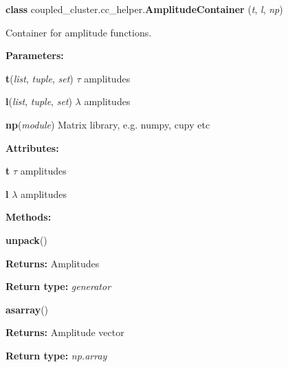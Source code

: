 \begin{tcolorbox}
    {\selectfont
    \textbf{class} coupled\_cluster.cc\_helper.\textbf{AmplitudeContainer}
    (\emph{t}, \emph{l}, \emph{np})

    \vspace{1em}
    Container for amplitude functions.

    \vspace{1em}
    \textbf{Parameters:}

    \hspace{2em}\textbf{t}(\emph{list}, \emph{tuple}, \emph{set}) $\tau$ amplitudes

    \hspace{2em}\textbf{l}(\emph{list}, \emph{tuple}, \emph{set}) $\lambda$ amplitudes

    \hspace{2em}\textbf{np}(\emph{module}) Matrix library, e.g. numpy, cupy etc

    \vspace{1em}
    \textbf{Attributes:}

    \hspace{2em} \textbf{t} $\tau$ amplitudes

    \hspace{2em} \textbf{l} $\lambda$ amplitudes

    \vspace{1em}
    \textbf{Methods:}

    \hspace{2em} \textbf{unpack}()
    \begin{adjustwidth}{4em}{}
        \textbf{Returns:} Amplitudes

        \textbf{Return type:} \emph{generator}
    \end{adjustwidth}

    \hspace{2em} \textbf{asarray}()
    \begin{adjustwidth}{4em}{}
        \textbf{Returns:} Amplitude vector

        \textbf{Return type:} \emph{np.array}
    \end{adjustwidth}

    }
\end{tcolorbox}